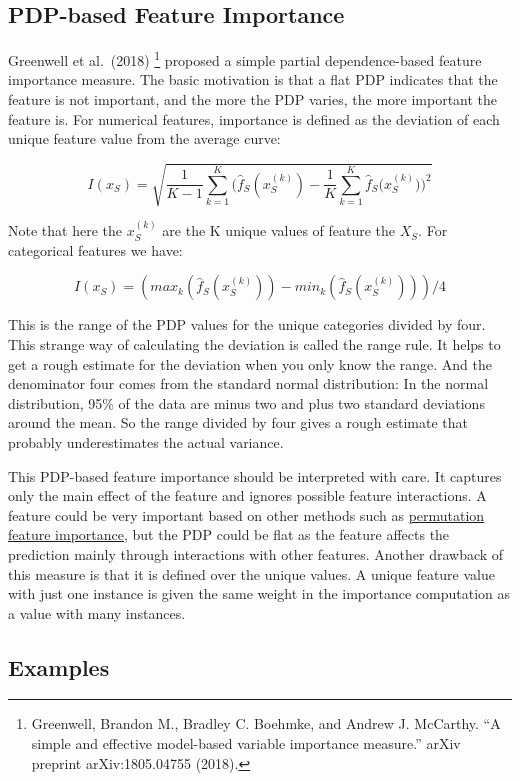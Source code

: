 \documentclass[
  10pt,
]{scrbook}
\begin{document}
\hypertarget{pdp-based-feature-importance}{%
\subsection{PDP-based Feature Importance}\label{pdp-based-feature-importance}}

Greenwell et al.~(2018) \footnote{Greenwell, Brandon M., Bradley C. Boehmke, and Andrew J. McCarthy. ``A simple and effective model-based variable importance measure.'' arXiv preprint arXiv:1805.04755 (2018).} proposed a simple partial dependence-based feature importance measure.
The basic motivation is that a flat PDP indicates that the feature is not important, and the more the PDP varies, the more important the feature is.
For numerical features, importance is defined as the deviation of each unique feature value from the average curve:

\[I(x_S) =  \sqrt{\frac{1}{K-1}\sum_{k=1}^K(\hat{f}_S(x^{(k)}_S) - \frac{1}{K}\sum_{k=1}^K \hat{f}_S({x^{(k)}_S))^2}}\]

Note that here the \(x^{(k)}_S\) are the K unique values of feature the \(X_S\).
For categorical features we have:

\[I(x_S) = (max_k(\hat{f}_S(x^{(k)}_S)) - min_k(\hat{f}_S(x^{(k)}_S)))/4\]

This is the range of the PDP values for the unique categories divided by four.
This strange way of calculating the deviation is called the range rule.
It helps to get a rough estimate for the deviation when you only know the range.
And the denominator four comes from the standard normal distribution:
In the normal distribution, 95\% of the data are minus two and plus two standard deviations around the mean.
So the range divided by four gives a rough estimate that probably underestimates the actual variance.

This PDP-based feature importance should be interpreted with care.
It captures only the main effect of the feature and ignores possible feature interactions.
A feature could be very important based on other methods such as \protect\hyperlink{feature-importance}{permutation feature importance}, but the PDP could be flat as the feature affects the prediction mainly through interactions with other features.
Another drawback of this measure is that it is defined over the unique values.
A unique feature value with just one instance is given the same weight in the importance computation as a value with many instances.

\hypertarget{examples}{%
\subsection{Examples}\label{examples}}
\end{document}
